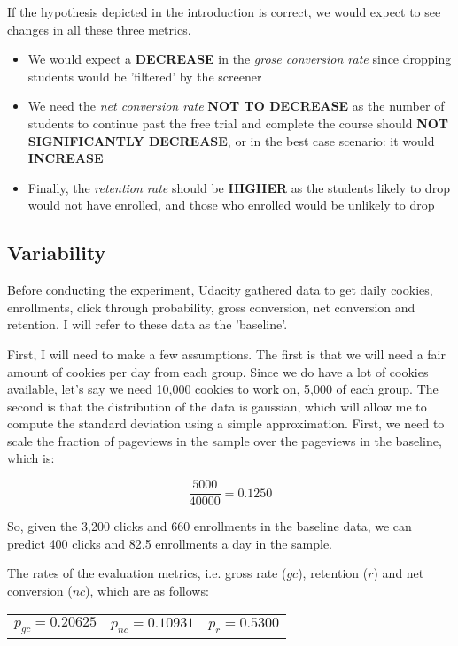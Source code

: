 \documentclass[11pt]{article}
\begin{document}
	If the hypothesis depicted in the introduction is correct, we would expect to see changes in all these three metrics.
	
	\begin{itemize}
		\item We would expect a \textbf{DECREASE} in the \textit{grose conversion rate} since dropping students would be 'filtered' by the screener
		\item We need the \textit{net conversion rate} \textbf{NOT TO DECREASE} as the number of students to continue past the free trial and complete the course should \textbf{NOT SIGNIFICANTLY DECREASE}, or in the best case scenario: it would \textbf{INCREASE}
		\item Finally, the \textit{retention rate} should be \textbf{HIGHER} as the students likely to drop would not have enrolled, and those who enrolled would be unlikely to drop
	\end{itemize}
	
	\subsection{Variability}
	
		Before conducting the experiment, Udacity gathered data to get daily cookies, enrollments, click through probability, gross conversion, net conversion and retention.
		I will refer to these data as the 'baseline'.
		
		First, I will need to make a few assumptions.
		The first is that we will need a fair amount of cookies per day from each group.
		Since we do have a lot of cookies available, let's say we need 10,000 cookies to work on, 5,000 of each group.
		The second is that the distribution of the data is gaussian, which will allow me to compute the standard deviation using a simple approximation.
		First, we need to scale the fraction of pageviews in the sample over the pageviews in the baseline, which is:
		
		\begin{displaymath}
			\frac{5000}{40000} = 0.1250
		\end{displaymath}
		
		So, given the 3,200 clicks and 660 enrollments in the baseline data, we can predict 400 clicks and 82.5 enrollments a day in the sample.
	
		The rates of the evaluation metrics, i.e. gross rate ($gc$), retention ($r$) and net conversion ($nc$), which are as follows: \\
		\begin{tabular}{ccc}
			$p_{gc} = 0.20625$ & $p_{nc} = 0.10931$ & $p_{r} = 0.5300$ \\
		\end{tabular}
		
\end{document}
